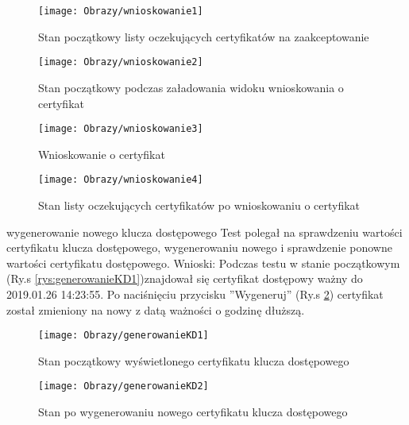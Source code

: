 \begin{enumerate*}
	
	\begin{figure}[ht!]

		\begin{minipage}{0.2\textwidth}
			\texttt{[image: Obrazy/wnioskowanie1]}
			\caption{Stan początkowy listy oczekujących certyfikatów na zaakceptowanie }
			\label{rys:wnioskowanie1}
		\end{minipage}
		\begin{minipage}{0.2\textwidth}
			\texttt{[image: Obrazy/wnioskowanie2]}
			\caption{Stan początkowy podczas załadowania widoku wnioskowania o certyfikat}
			\label{rys:wnioskowanie2}
		\end{minipage}
	
		\begin{minipage}{0.2\textwidth}
		\texttt{[image: Obrazy/wnioskowanie3]}
		\caption{Wnioskowanie o certyfikat}
		\label{rys:wnioskowanie3}
	\end{minipage}
	\begin{minipage}{0.2\textwidth}
		\texttt{[image: Obrazy/wnioskowanie4]}
		\caption{Stan listy oczekujących certyfikatów po wnioskowaniu o certyfikat}
		\label{rys:wnioskowanie4}
	\end{minipage}
	\end{figure}
	
	
	
	
	\item wygenerowanie nowego klucza dostępowego\newline
	Test polegał na sprawdzeniu wartości certyfikatu klucza dostępowego, wygenerowaniu nowego i sprawdzenie ponowne wartości certyfikatu dostępowego.
	Wnioski: Podczas testu w stanie początkowym (Ry.s \ref{rys:generowanieKD1})znajdował się certyfikat dostępowy ważny do 2019.01.26 14:23:55. Po naciśnięciu przycisku ''Wygeneruj''  (Ry.s \ref{rys:generowanieKD2}) certyfikat został zmieniony na nowy z datą ważności o godzinę dłuższą.
 
	
	\begin{figure}[ht!]
		
		\begin{minipage}{0.4\textwidth}
			\texttt{[image: Obrazy/generowanieKD1]}
			\caption{Stan początkowy wyświetlonego certyfikatu klucza dostępowego }
			\label{rys:generowanieKD1}
		\end{minipage}
		\begin{minipage}{0.4\textwidth}
			\texttt{[image: Obrazy/generowanieKD2]}
			\caption{Stan po wygenerowaniu nowego certyfikatu klucza dostępowego}
			\label{rys:generowanieKD2}
		\end{minipage}
		

\end{figure}
\end{enumerate*}
